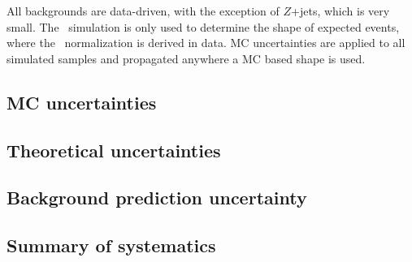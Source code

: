All backgrounds are data-driven, with the exception of $Z$+jets, which is very small. The \ttbar\ simulation is only used to determine the shape of expected events, where the \ttbar\ normalization is derived in data. MC uncertainties are applied to all simulated samples and propagated anywhere a MC based shape is used.

\subsection{MC uncertainties}
\label{sec:boosted-systematics-mc}


\subsection{Theoretical uncertainties}
\label{sec:boosted-systematics-theory}


\subsection{Background prediction uncertainty}
\label{sec:boosted-systematics-bkg}


\subsection{Summary of systematics}
\label{sec:boosted-systematics-numbers}

